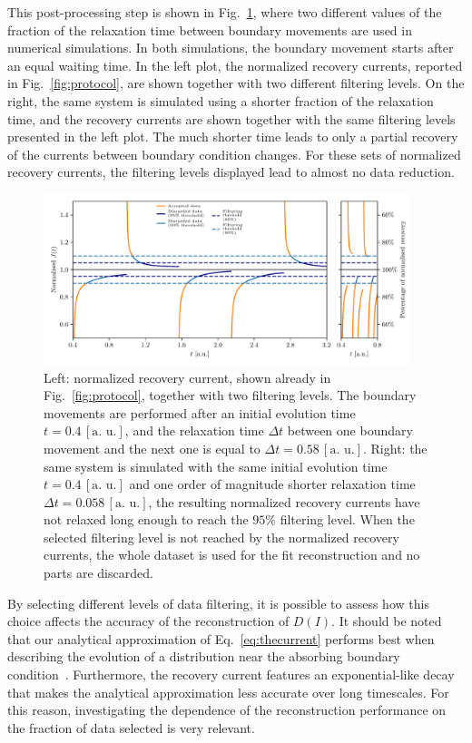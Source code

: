 This post-processing step is shown in Fig.~\ref{fig:postprocessing}, where two different values of the fraction of the relaxation time between boundary movements are used in numerical simulations. In both simulations, the boundary movement starts after an equal waiting time. In the left plot, the normalized recovery currents, reported in Fig.~\ref{fig:protocol}, are shown together with two different filtering levels. On the right, the same system is simulated using a shorter fraction of the relaxation time, and the recovery currents are shown together with the same filtering levels presented in the left plot. The much shorter time leads to only a partial recovery of the currents between boundary condition changes. For these sets of normalized recovery currents, the filtering levels displayed lead to almost no data reduction.
%
\begin{figure}[t]
    \centering 
    \includegraphics[width=0.95\textwidth]{4_probing_the_diffusive_behavior/figs/final/the_discarded_data.pdf}
    \caption{Left: normalized recovery current, shown already in Fig.~\ref{fig:protocol}, together with two filtering levels. The boundary movements are performed after an initial evolution time $t=0.4 \, [\text{a. u.}]$, and the relaxation time $\Delta t$ between one boundary movement and the next one is equal to $\Delta t=0.58 \, [\text{a. u.}]$. Right: the same system is simulated with the same initial evolution time $t=0.4 \, [\text{a. u.}]$ and one order of magnitude shorter relaxation time $\Delta t=0.058 \, [\text{a. u.}]$, the resulting normalized recovery currents have not relaxed long enough to reach the $95\%$ filtering level. When the selected filtering level is not reached by the normalized recovery currents, the whole dataset is used for the fit reconstruction and no parts are discarded.}
    \label{fig:postprocessing}
\end{figure}
%

By selecting different levels of data filtering, it is possible to assess how this choice affects the accuracy of the reconstruction of $D(I)$. It should be noted that our analytical approximation of Eq.~\eqref{eq:thecurrent} performs best when describing the evolution of a distribution near the absorbing boundary condition~\cite{montanari:ipac2021:tupab233}. Furthermore, the recovery current features an exponential-like decay that makes the analytical approximation less accurate over long timescales. For this reason, investigating the dependence of the reconstruction performance on the fraction of data selected is very relevant.

